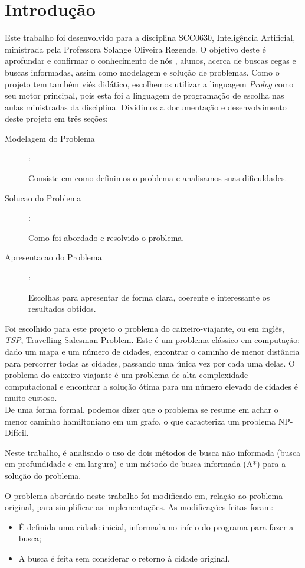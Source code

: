 \documentclass[12pt,a4paper]{article}
\begin{document}
\section{Introdução}
Este trabalho foi desenvolvido para a disciplina SCC0630, Inteligência Artificial, ministrada pela Professora Solange Oliveira Rezende. O objetivo deste é aprofundar e confirmar o conhecimento de nós , alunos, acerca de buscas cegas e buscas informadas, assim como modelagem e solução de problemas. Como o projeto tem também viés didático, escolhemos utilizar a linguagem \emph{Prolog} como seu motor principal, pois esta foi a linguagem de programação de escolha nas aulas ministradas da disciplina. Dividimos a documentação e desenvolvimento deste projeto em três seções:
\begin{description}
  \item [Modelagem do Problema]:

Consiste em como definimos o problema e analisamos suas dificuldades.
\item [Solucao do Problema]:

Como  foi abordado e resolvido o problema.
\item[Apresentacao do Problema]:

Escolhas para apresentar de forma clara, coerente e interessante os resultados obtidos.  
\end{description}

Foi escolhido para este projeto o problema do caixeiro-viajante, ou em inglês, \emph{TSP}, Travelling Salesman Problem.
Este é um problema clássico em computação: dado um mapa e um número de cidades, encontrar o caminho de menor distância para percorrer todas as cidades,
passando uma única vez por cada uma delas. O problema do caixeiro-viajante é um problema de alta complexidade computacional e encontrar a solução ótima para um número elevado de cidades é muito custoso.\\
De uma forma formal, podemos dizer que o problema se resume em achar o menor caminho hamiltoniano em um grafo, o que caracteriza um problema NP-Difícil.

Neste trabalho, é analisado o uso de dois métodos de busca não informada (busca em profundidade e em largura) e um método de busca informada (A*) para a solução do problema.

O problema abordado neste trabalho foi modificado em, relação ao problema original, para simplificar as implementações. As modificações feitas foram:
\begin{itemize}
  \item 

É definida uma cidade inicial, informada no início do programa para fazer a busca;
\item A busca é feita sem considerar o retorno à cidade original.
\end{itemize}
\end{document}
